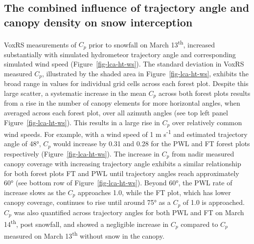 \documentclass[
  letterpaper,
  DIV=11,
  numbers=noendperiod]{scrartcl}
\begin{document}
\subsection{The combined influence of trajectory angle and canopy
density on snow
interception}\label{the-combined-influence-of-trajectory-angle-and-canopy-density-on-snow-interception}

VoxRS measurements of \(C_p\) prior to snowfall on March
13\textsuperscript{th}, increased substantially with simulated
hydrometeor trajectory angle and corresponding simulated wind speed
(Figure~\ref{fig-lca-ht-ws}). The standard deviation in VoxRS measured
\(C_p\), illustrated by the shaded area in Figure~\ref{fig-lca-ht-ws},
exhibits the broad range in values for individual grid cells across each
forest plot. Despite this large scatter, a systematic increase in the
mean \(C_p\) across both forest plots results from a rise in the number
of canopy elements for more horizontal angles, when averaged across each
forest plot, over all azimuth angles (see top left panel
Figure~\ref{fig-lca-ht-ws}). This results in a large rise in \(C_p\)
over relatively common wind speeds. For example, with a wind speed of 1
m s\textsuperscript{-1} and estimated trajectory angle of 48°, \(C_p\)
would increase by 0.31 and 0.28 for the PWL and FT forest plots
respectively (Figure~\ref{fig-lca-ht-ws}). The increase in \(C_p\) from
nadir measured canopy coverage with increasing trajectory angle exhibits
a similar relationship for both forest plots FT and PWL until trajectory
angles reach approximately 60° (see bottom row of
Figure~\ref{fig-lca-ht-ws}). Beyond 60°, the PWL rate of increase slows
as the \(C_p\) approaches 1.0, while the FT plot, which has lower canopy
coverage, continues to rise until around 75° as a \(C_p\) of 1.0 is
approached. \(C_p\) was also quantified across trajectory angles for
both PWL and FT on March 14\textsuperscript{th}, post snowfall, and
showed a negligible increase in \(C_p\) compared to \(C_p\) measured on
March 13\textsuperscript{th} without snow in the canopy.
\end{document}
